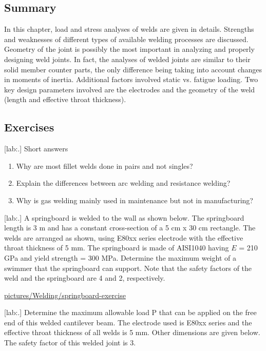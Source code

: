 \documentclass[a4paper,openany,nobib]{tufte-book}
\begin{document}
{{\subsection{Summary}
\label{summary-6}
In this chapter, load and stress analyses of welds are given in details.
Strengths and weaknesses of different types of available welding
processes are discussed. Geometry of the joint is possibly the most
important in analyzing and properly designing weld joints. In fact, the
analyses of welded joints are similar to their solid member counter
parts, the only difference being taking into account changes in moments
of inertia. Additional factors involved static vs. fatigue loading. Two
key design parameters involved are the electrodes and the geometry of
the weld (length and effective throat thickness).

\subsection{Exercises}
\label{exercises-6}
[lab:.] Short answers

\begin{enumerate}
\item Why are most fillet welds done in pairs and not singles?

\item Explain the differences between arc welding and resistance welding?

\item Why is gas welding mainly used in maintenance but not in
manufacturing?
\end{enumerate}

[lab:.] A springboard is welded to
the wall as shown below. The springboard length is 3 m and has a
constant cross-section of a 5 cm x 30 cm rectangle. The welds are
arranged as shown, using E80xx series electrode with the effective
throat thickness of 5 mm. The springboard is made of AISI1040 having \(E\)
= 210 GPa and yield strength = 300 MPa. Determine the maximum weight of
a swimmer that the springboard can support. Note that the safety factors
of the weld and the springboard are 4 and 2, respectively.


\url{pictures/Welding/springboard-exercise}

[lab:.] Determine the maximum
allowable load P that can be applied on the free end of this welded
cantilever beam. The electrode used is E80xx series and the effective
throat thickness of all welds is 5 mm. Other dimensions are given below.
The safety factor of this welded joint is 3.


}}
\end{document}
